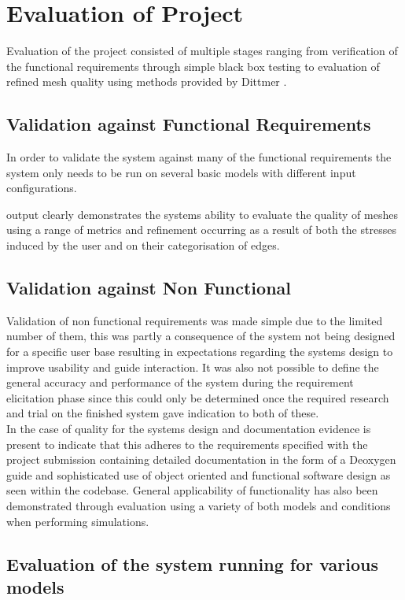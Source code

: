 
\section{Evaluation of Project}
Evaluation of the project consisted of multiple stages ranging from verification of the functional requirements through simple black box testing to evaluation of refined mesh quality using methods provided by Dittmer \cite{Dittmer}. 

\subsection{Validation against Functional Requirements}
In order to validate the system against many of the functional requirements the system only needs to be run on several basic models with different input configurations. 

output clearly demonstrates the systems ability to evaluate the quality of meshes using a range of metrics and refinement occurring as a result of both the stresses induced by the user and on their categorisation of edges. 


\subsection{Validation against Non Functional}
Validation of non functional requirements was made simple due to the limited number of them, this was partly a consequence of the system not being designed for a specific user base resulting in expectations regarding the systems design to improve usability and guide interaction. It was also not possible to define the general accuracy and performance of the system during the requirement elicitation phase since this could only be determined once the required research and trial on the finished system gave indication to both of these. \\


\noindent
In the case of quality for the systems design and documentation evidence is present to indicate that this adheres to the requirements specified with the project submission containing detailed documentation in the form of a Deoxygen guide and sophisticated use of object oriented and functional software design as seen within the codebase. General applicability of functionality has also been demonstrated through evaluation using a variety of both models and conditions when performing simulations.

\subsection{Evaluation of the system running for various models}

